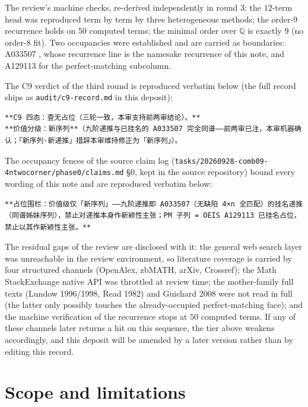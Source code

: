 \documentclass[11pt]{article}
\theoremstyle{definition}
\begin{document}
The review's machine checks, re-derived independently in round 3: the $12$-term
head was reproduced term by term by three heterogeneous methods; the order-$9$
recurrence holds on $50$ computed terms; the minimal order over $\mathbb{Q}$ is
exactly $9$ (no order-$8$ fit). Two occupancies were established and are carried
as boundaries: A033507 \cite{oeis-a033507}, whose recurrence line is the
namesake recurrence of this note, and A129113 \cite{oeis-a129113} for the
perfect-matching subcolumn.

The C9 verdict of the third round is reproduced verbatim below (the full record
ships as \texttt{audit/c9-record.md} in this deposit):
\begin{lstlisting}[basicstyle=\ttfamily\footnotesize,frame=none]
**C9 四态：查无占位（三轮一致，本审支持前两审结论）。**
**价值分级：新序列**（九阶递推与已挂名的 A033507 完全同谱——前两审已注，本审机器确认；「新序列·新递推」措辞本审维持修正为「新序列」）。
\end{lstlisting}

The occupancy fences of the source claim log
(\texttt{tasks/20260928-}\allowbreak\texttt{comb09-4ntwocorner/}\allowbreak\texttt{phase0/claims.md}
\S 0, kept in the source repository) bound every wording of this note and are
reproduced verbatim below:
\begin{lstlisting}[basicstyle=\ttfamily\footnotesize,frame=none]
**占位围栏：价值级仅「新序列」——九阶递推即 A033507（无缺陷 4×n 全匹配）的挂名递推（同谱姊妹序列），禁止对递推本身作新颖性主张；PM 子列 = OEIS A129113 已挂名占位，禁止以其作新颖性主张。**
\end{lstlisting}

The residual gaps of the review are disclosed with it: the general web search
layer was unreachable in the review environment, so literature coverage is
carried by four structured channels (OpenAlex, zbMATH, arXiv, Crossref); the
Math StackExchange native API was throttled at review time; the mother-family
full texts (Lundow 1996/1998, Read 1982) and Guichard 2008 were not read in
full (the latter only possibly touches the already-occupied perfect-matching
face); and the machine verification of the recurrence stops at $50$ computed
terms. If any of these channels later returns a hit on this sequence, the tier
above weakens accordingly, and this deposit will be amended by a later version
rather than by editing this record.

\section{Scope and limitations}
\end{document}
